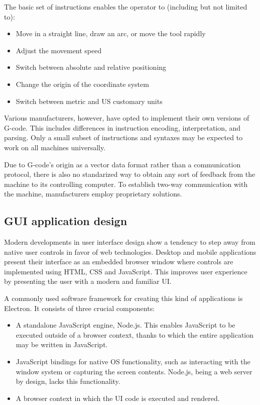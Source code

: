 The basic set of instructions enables the operator to (including but not
limited to):
\begin{itemize}
    \item Move in a straight line, draw an arc, or move the tool rapidly
    \item Adjust the movement speed
    \item Switch between absolute and relative positioning
    \item Change the origin of the coordinate system
    \item Switch between metric and US customary units
\end{itemize}
Various manufacturers, however, have opted to implement their own versions of
G-code. This includes differences in instruction encoding, interpretation, and
parsing. Only a small subset of instructions and syntaxes may be expected to
work on all machines universally.

Due to G-code's origin as a vector data format rather than a communication
protocol, there is also no standarized way to obtain any sort of feedback from
the machine to its controlling computer. To establish two-way communication
with the machine, manufacturers employ proprietary solutions.

\subsection{GUI application design}

Modern developments in user interface design show a tendency to step away from
native user controls in favor of web technologies. Desktop and mobile
applications present their interface as an embedded browser window where
controls are implemented using HTML, CSS and JavaScript. This improves user
experience by presenting the user with a modern and familiar UI.

A commonly used software framework for creating this kind of applications is
Electron. It consists of three crucial components:
\begin{itemize}
    \item A standalone JavaScript engine, Node.js. This enables JavaScript to
    be executed outside of a browser context, thanks to which the entire
    application may be written in JavaScript.
    \item JavaScript bindings for native OS functionality, such as interacting
    with the window system or capturing the screen contents. Node.js, being a
    web server by design, lacks this functionality.
    \item A browser context in which the UI code is executed and rendered.
\end{itemize}

